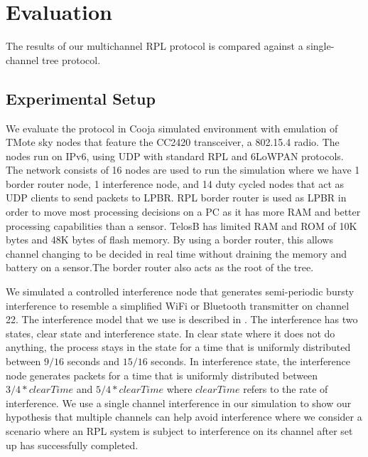 \section{Evaluation}
The results of our multichannel RPL protocol is compared against a single-channel tree protocol.

\subsection{Experimental Setup}
We evaluate the protocol in Cooja simulated environment with emulation of TMote sky nodes that feature the CC2420 transceiver, a 802.15.4 radio. The nodes run on IPv6, using UDP with standard RPL and 6LoWPAN protocols. The network consists of 16 nodes are used to run the simulation where we have 1 border router node, 1 interference node, and 14 duty cycled nodes that act as UDP clients to send packets to LPBR. RPL border router is used as LPBR in order to move most processing decisions on a PC as it has more RAM and better processing capabilities than a sensor. TelosB has limited RAM and ROM of 10K bytes and 48K bytes of flash memory. By using a border router, this allows channel changing to be decided in real time without draining the memory and battery on a sensor.The border router also acts as the root of the tree.

We simulated a controlled interference node that generates semi-periodic bursty interference to resemble a simplified WiFi or Bluetooth transmitter on channel 22. The interference model that we use is described in \cite{Boano:2010:MSM:2127940.2127963}. The interference has two states, clear state and interference state. In clear state where it does not do anything, the process stays in the state for a time that is uniformly distributed between $9/16$ seconds and $15/16$ seconds. In interference state, the interference node generates packets for a time that is uniformly distributed between $3/4 * clearTime$ and $5/4 * clearTime$ where $clearTime$ refers to the rate of interference. We use a single channel interference in our simulation to show our hypothesis that multiple channels can help avoid interference where we consider a scenario where an RPL system is subject to interference on its channel after set up has successfully completed.






